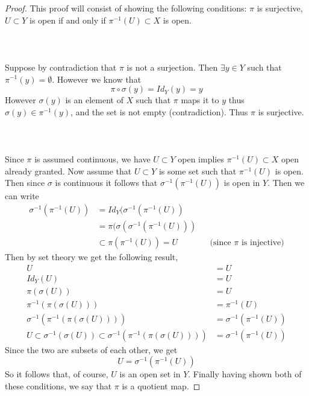 \documentclass{article}
\theoremstyle{definition}
\begin{document}
\begin{proof}
    This proof will consist of showing the following conditions: $\pi$ is surjective, $U \subset Y$ is open if and only if $\pi^{-1}(U) \subset X$ is open.\\\\
    \\\\
    Suppose by contradiction that $\pi$ is not a surjection. Then $\exists y \in Y$ such that $\pi^{-1}(y) = \emptyset$.
    However we know that 
    \[
        \pi \circ \sigma (y) = Id_Y (y) = y
    \]
    However $\sigma(y)$ is an element of $X$ such that $\pi$ maps it to $y$ thus $\sigma(y) \in \pi^{-1}(y)$, and the set is not empty (contradiction).
    Thus $\pi$ is surjective.\\\\
    \\\\
    Since $\pi$ is assumed continuous, we have $U \subset Y$ open implies $\pi^{-1}(U) \subset X$ open already granted.
    Now assume that $U \subset Y$ is some set such that $\pi^{-1}(U)$ is open. Then since $\sigma$ is continuous it follows that 
    $\sigma^{-1}(\pi^{-1}(U))$ is open in $Y$. Then we can write 
    \begin{align*}
        \sigma^{-1}(\pi^{-1}(U)) &= Id_Y(\sigma^{-1}(\pi^{-1}(U))\\
        &= \pi(\sigma(\sigma^{-1}(\pi^{-1}(U))) \\
        &\subset \pi(\pi^{-1}(U)) = U && \text{(since $\pi$ is injective)}
    \end{align*}
    Then by set theory we get the following result,
    \begin{align*}
        U &= U \\
        Id_Y(U) &= U \\
        \pi (\sigma(U)) &= U \\
        \pi^{-1}(\pi(\sigma(U))) &= \pi^{-1}(U) \\
        \sigma^{-1}(\pi^{-1}(\pi(\sigma(U)))) &= \sigma^{-1}(\pi^{-1}(U))\\
        U \subset \sigma^{-1}(\sigma(U)) \subset \sigma^{-1}(\pi^{-1}(\pi(\sigma(U)))) &= \sigma^{-1}(\pi^{-1}(U))
    \end{align*}
    Since the two are subsets of each other, we get 
    \[
        U = \sigma^{-1}(\pi^{-1}(U))
    \]
    So it follows that, of course, $U$ is an open set in $Y$. Finally having shown both of these conditions, we say that $\pi$ is a quotient map.
\end{proof}
\end{document}
